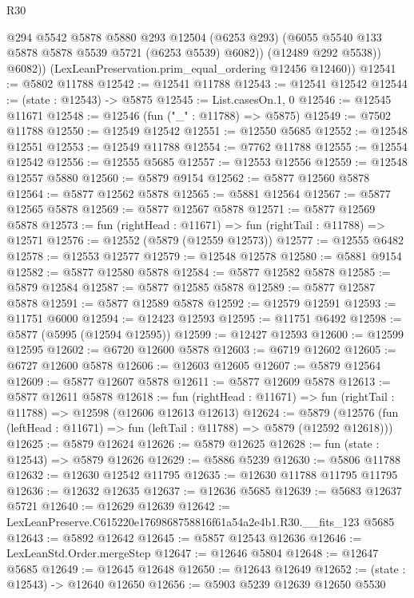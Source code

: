 \begin{lexlean}{R30}
\begin{coremodule}
              @294
              @5542
              @5878
              @5880
              @293
              @12504
              (@6253 @293)
              (@6055 @5540 @133 @5878 @5878 @5539 @5721 (@6253 @5539) @6082))
            (@12489 @292 @5538))
          @6082))
      (LexLeanPreservation.prim_equal_ordering @12456 @12460))
@12541 := @5802 @11788
@12542 := @12541 @11788
@12543 := @12541 @12542
@12544 := (state : @12543) -> @5875
@12545 := List.casesOn.{1, 0}
@12546 := @12545 @11671
@12548 := @12546 (fun ("_" : @11788) => @5875)
@12549 := @7502 @11788
@12550 := @12549 @12542
@12551 := @12550 @5685
@12552 := @12548 @12551
@12553 := @12549 @11788
@12554 := @7762 @11788
@12555 := @12554 @12542
@12556 := @12555 @5685
@12557 := @12553 @12556
@12559 := @12548 @12557 @5880
@12560 := @5879 @9154
@12562 := @5877 @12560 @5878
@12564 := @5877 @12562 @5878
@12565 := @5881 @12564
@12567 := @5877 @12565 @5878
@12569 := @5877 @12567 @5878
@12571 := @5877 @12569 @5878
@12573 := fun (rightHead : @11671) => fun (rightTail : @11788) => @12571
@12576 := @12552 (@5879 (@12559 @12573))
@12577 := @12555 @6482
@12578 := @12553 @12577
@12579 := @12548 @12578
@12580 := @5881 @9154
@12582 := @5877 @12580 @5878
@12584 := @5877 @12582 @5878
@12585 := @5879 @12584
@12587 := @5877 @12585 @5878
@12589 := @5877 @12587 @5878
@12591 := @5877 @12589 @5878
@12592 := @12579 @12591
@12593 := @11751 @6000
@12594 := @12423 @12593
@12595 := @11751 @6492
@12598 := @5877 (@5995 (@12594 @12595))
@12599 := @12427 @12593
@12600 := @12599 @12595
@12602 := @6720 @12600 @5878
@12603 := @6719 @12602
@12605 := @6727 @12600 @5878
@12606 := @12603 @12605
@12607 := @5879 @12564
@12609 := @5877 @12607 @5878
@12611 := @5877 @12609 @5878
@12613 := @5877 @12611 @5878
@12618 := fun (rightHead : @11671) => fun (rightTail : @11788) => @12598 (@12606 @12613 @12613)
@12624 := @5879
    (@12576 (fun (leftHead : @11671) => fun (leftTail : @11788) => @5879 (@12592 @12618)))
@12625 := @5879 @12624
@12626 := @5879 @12625
@12628 := fun (state : @12543) => @5879 @12626
@12629 := @5886 @5239
@12630 := @5806 @11788
@12632 := @12630 @12542 @11795
@12635 := @12630 @11788 @11795 @11795
@12636 := @12632 @12635
@12637 := @12636 @5685
@12639 := @5683 @12637 @5721
@12640 := @12629 @12639
@12642 := LexLeanPreserve.C615220e1769868758816f61a54a2e4b1.R30.__fits_123 @5685
@12643 := @5892 @12642
@12645 := @5857 @12543 @12636
@12646 := LexLeanStd.Order.mergeStep
@12647 := @12646 @5804
@12648 := @12647 @5685
@12649 := @12645 @12648
@12650 := @12643 @12649
@12652 := (state : @12543) -> @12640 @12650
@12656 := @5903 @5239 @12639 @12650 @5530

\end{coremodule}
\end{lexlean}
